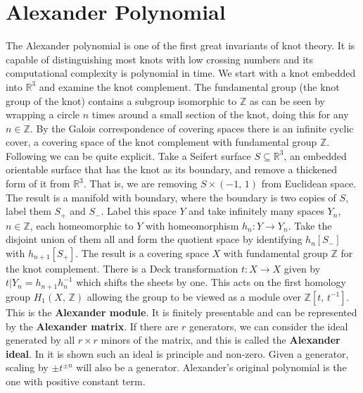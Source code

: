 \section{Alexander Polynomial}
    The Alexander polynomial is one of the first great invariants of knot theory.
    It is capable of distinguishing most knots with low crossing numbers and
    its computational complexity is polynomial in time. We start with a
    knot embedded into $\mathbb{R}^{3}$ and examine the knot complement.
    The fundamental group (the knot group of the knot) contains a subgroup
    isomorphic to $\mathbb{Z}$ as can be seen by wrapping a circle $n$ times
    around a small section of the knot, doing this for any $n\in\mathbb{Z}$.
    By the Galois correspondence of covering spaces
    \cite[Sec.~1.3]{HatcherAlgTop} there is an infinite cyclic cover,
    a covering space of the knot complement with fundamental group
    $\mathbb{Z}$. Following \cite[p.~53]{LickorishKnotTheory} we can be quite
    explicit. Take a Seifert surface $S\subseteq\mathbb{R}^{3}$, an embedded
    orientable surface that has the knot as its boundary, and remove a
    thickened form of it from $\mathbb{R}^{3}$. That is, we are removing
    $S\times(-1,\,1)$ from Euclidean space. The result is a manifold with
    boundary, where the boundary is two copies of $S$, label them $S_{+}$ and
    $S_{-}$. Label this space $Y$ and take infinitely many spaces $Y_{n}$,
    $n\in\mathbb{Z}$, each homeomorphic to $Y$ with homeomorphism
    $h_{n}:Y\rightarrow{Y}_{n}$. Take the disjoint union of them all and
    form the quotient space by identifying $h_{n}[S_{-}]$ with $h_{n+1}[S_{+}]$.
    The result is a covering space $X$ with fundamental group $\mathbb{Z}$
    for the knot complement. There is a Deck transformation
    $t:X\rightarrow{X}$ given by $t|Y_{n}=h_{n+1}h_{n}^{-1}$ which
    shifts the sheets by one. This acts on the first homology group
    $H_{1}(X,\,\mathbb{Z})$ allowing the group to be viewed as a
    module over $\mathbb{Z}[t,\,t^{-1}]$. This is the
    \textbf{Alexander module}. It is finitely presentable and can be
    represented by the \textbf{Alexander matrix}. If there are $r$ generators,
    we can consider the ideal generated by all $r\times{r}$ minors of the
    matrix, and this is called the \textbf{Alexander ideal}. In
    \cite{AlexanderTopologicalInvariants} it is shown such an ideal is
    principle and non-zero. Given a generator, scaling by $\pm{t}^{\pm{n}}$ will
    also be a generator. Alexander's original polynomial is the one with
    positive constant term.
    \par\hfill\par
